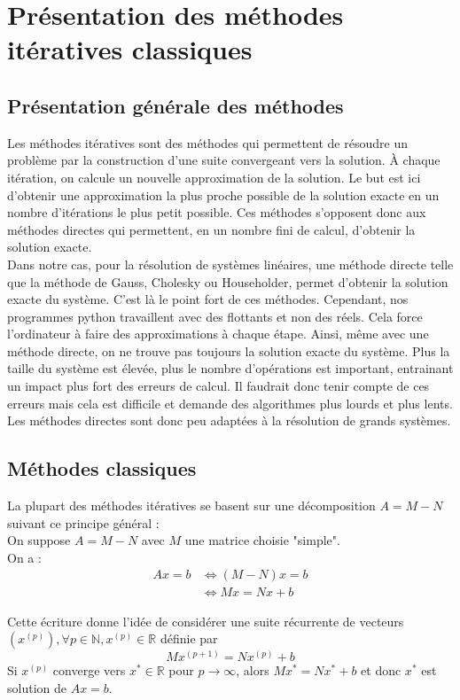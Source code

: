 \chapter{Présentation des méthodes itératives classiques}
\section{Présentation générale des méthodes}
Les méthodes itératives sont des méthodes qui permettent de résoudre un problème par la construction d'une suite convergeant vers la solution. À chaque itération, on calcule un nouvelle approximation de la solution. Le but est ici d'obtenir une approximation la plus proche possible de la solution exacte en un nombre d'itérations le plus petit possible. Ces méthodes s'opposent donc aux méthodes directes qui permettent, en un nombre fini de calcul, d'obtenir la solution exacte.\\

Dans notre cas, pour la résolution de systèmes linéaires, une méthode directe telle que la méthode de Gauss, Cholesky ou Householder, permet d'obtenir la solution exacte du système. C'est là le point fort de ces méthodes. Cependant, nos programmes python travaillent avec des flottants et non des réels. Cela force l'ordinateur à faire des approximations à chaque étape. Ainsi, même avec une méthode directe, on ne trouve pas toujours la solution exacte du système. Plus la taille du système est élevée, plus le nombre d'opérations est important, entrainant un impact plus fort des erreurs de calcul. Il faudrait donc tenir compte de ces erreurs mais cela est difficile et demande des algorithmes plus lourds et plus lents. Les méthodes directes sont donc peu adaptées à la résolution de grands systèmes.

\section{Méthodes classiques}
La plupart des méthodes itératives se basent sur une décomposition $A = M-N$ suivant ce principe général : \\
On suppose $A = M-N$ avec $M$ une matrice choisie "simple".\\
On a :
\begin{align*}
Ax = b &\Leftrightarrow \left(M-N\right)x = b\\
		 &\Leftrightarrow Mx = Nx + b
\end{align*}

Cette écriture donne l'idée de considérer une suite récurrente de vecteurs $\left(x^{(p)}\right),  \forall p \in \mathbb{N}, x^{(p)} \in \mathbb{R}$ définie par
$$M x^{(p+1)} = Nx^{(p)} + b$$
Si $x^{(p)}$ converge vers $x^* \in \mathbb{R}$ pour $p \to \infty$, alors $Mx^* = Nx^*+b$ et donc $x^*$ est solution de $Ax = b$.\\

